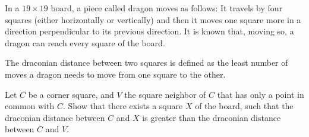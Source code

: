 In a $ 19\times 19$ board, a piece called dragon moves as follows: It travels by four squares (either horizontally or vertically) and then it moves one square more in a direction perpendicular to its previous direction. It is known that, moving so, a dragon can reach every square of the board.

The draconian distance between two squares is defined as the least number of moves a dragon needs to move from one square to the other.

Let $ C$ be a corner square, and $ V$ the square neighbor of $ C$ that has only a point in common with $ C$. Show that there exists a square $ X$ of the board, such that the draconian distance between $ C$ and $ X$ is greater than the draconian distance between $ C$ and $ V$.